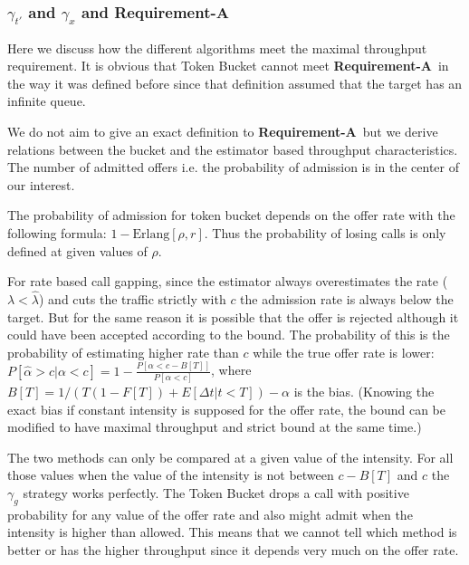 \documentclass[conference]{IEEEtran}
\newcommand{\comment}[1]{}
\newcommand{\reqA}{\textbf{Requirement-A}}
\begin{document}
\subsubsection{$\gamma_{t'}$ and $\gamma_x$ and Requirement-A\ }
Here we discuss how the different algorithms meet the maximal
throughput requirement. It is obvious that Token Bucket cannot meet
\reqA\ in the way it was defined before since that definition
assumed that the target has an infinite queue.

We do not aim to give an exact definition to \reqA\ but we derive
relations between the bucket and the estimator based throughput
characteristics. The number of admitted offers i.e. the probability
of admission is in the center of our interest.

The probability of admission for token bucket depends on the offer
rate with the following formula: $1-\mathrm{Erlang}[\rho,r]$. Thus
the probability of losing calls is only defined at given values of
$\rho$.

For rate based call gapping, since the estimator always
overestimates the rate ($\lambda<\hat{\lambda}$) and cuts the
traffic strictly with $c$ the admission rate is always below the
target. But for the same reason it is possible that the offer is
rejected although it could have been accepted according to the
bound. The probability of this is the probability of estimating
higher rate than $c$ while the true offer rate is lower:
$P[\hat{\alpha}>c|\alpha<c]=1-\frac{P[\alpha<c-B[T]]}{P[\alpha<c]}$,
where $B[T]=1/(T(1-F[T])+E[\Delta t|t<T])-\alpha$ is the bias.
(Knowing the exact bias if constant intensity is supposed for the
offer rate, the bound can be modified to have maximal throughput and
strict bound at the same time.)

The two methods can only be compared at a given value of the
intensity. For all those values when the value of the intensity is
not between $c-B[T]$ and $c$ the $\gamma_g$ strategy works
perfectly. The Token Bucket drops a call with positive probability
for any value of the offer rate and also might admit when the
intensity is higher than allowed. This means that we cannot tell
which method is better or has the higher throughput since it depends
very much on the offer rate.

\comment{Annak lenne itten ertelme, hogy mondjuk $\lambda\in
\mbox{Normal}(c,\mu)$ es igy ki lehet szamolni, hogy hogyan talalja
el a dolgokat egyik, ill. masik. \comment{Arrol van itt szo, hogy a
valaki megmondana nekem, hogy pontosan hova esik az offer rate,
milyen tartomanyba. Mondjuk valaki adna nekem egy eloszlast az offer
rate-re, akkor mar meg tudnam mondani, addig nem.}}
\end{document}
